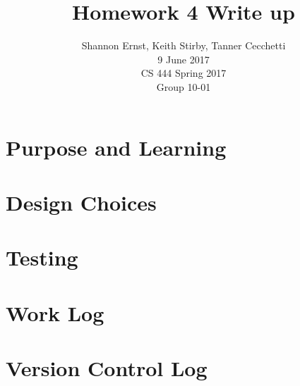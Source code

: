 \documentclass[letterpaper,10pt,serif,draftclsnofoot,onecolumn,compsoc,titlepage]{IEEEtran}
\title{Homework 4 Write up}
\author{Shannon Ernst, Keith Stirby, Tanner Cecchetti\\ 9 June 2017 \\ CS 444 Spring 2017 \\ Group 10-01}
\begin{document}
\maketitle
\begin{abstract}
\end{abstract}
\newpage
\tableofcontents
\newpage
\section{Purpose and Learning}
\section{Design Choices}
\section{Testing}
\section{Work Log}
\section{Version Control Log}
\end{document}
